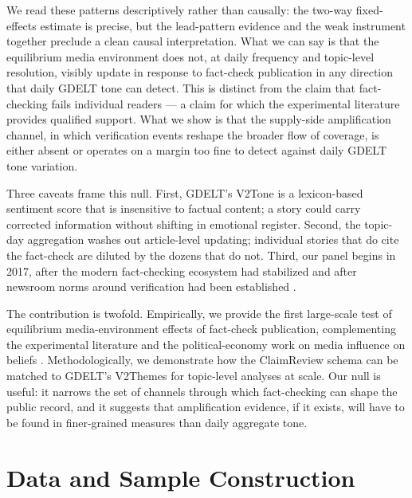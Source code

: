 \documentclass[12pt]{article}
\begin{document}
We read these patterns descriptively rather than causally: the two-way fixed-effects estimate is precise, but the lead-pattern evidence and the weak instrument together preclude a clean causal interpretation. What we can say is that the equilibrium media environment does not, at daily frequency and topic-level resolution, visibly update in response to fact-check publication in any direction that daily GDELT tone can detect. This is distinct from the claim that fact-checking fails individual readers --- a claim for which the experimental literature provides qualified support. What we show is that the supply-side amplification channel, in which verification events reshape the broader flow of coverage, is either absent or operates on a margin too fine to detect against daily GDELT tone variation.

Three caveats frame this null. First, GDELT's V2Tone is a lexicon-based sentiment score that is insensitive to factual content; a story could carry corrected information without shifting in emotional register. Second, the topic-day aggregation washes out article-level updating; individual stories that do cite the fact-check are diluted by the dozens that do not. Third, our panel begins in 2017, after the modern fact-checking ecosystem had stabilized and after newsroom norms around verification had been established \citep{graves2016}.

The contribution is twofold. Empirically, we provide the first large-scale test of equilibrium media-environment effects of fact-check publication, complementing the experimental literature \citep{nyhan2010,walter2020,guess2020digital} and the political-economy work on media influence on beliefs \citep{dellavigna2007,gerber2009,enikolopov2011,yanagizawa2014,chiang2011}. Methodologically, we demonstrate how the ClaimReview schema can be matched to GDELT's V2Themes for topic-level analyses at scale. Our null is useful: it narrows the set of channels through which fact-checking can shape the public record, and it suggests that amplification evidence, if it exists, will have to be found in finer-grained measures than daily aggregate tone.

\section{Data and Sample Construction}
\end{document}
